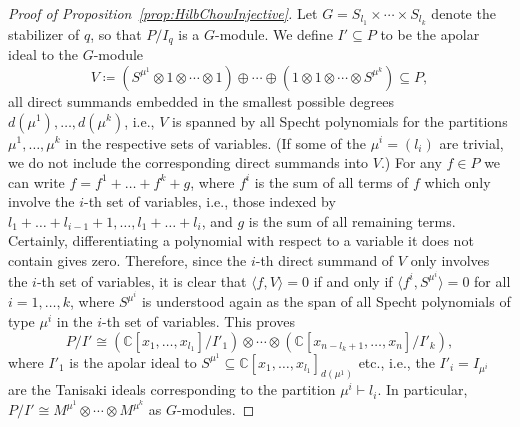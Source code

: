 \documentclass[11pt]{amsart}
\theoremstyle{definition}
\newcommand{\CC}{\mathbb{C}}
\begin{document}
\begin{proof}[Proof of Proposition~\ref{prop:HilbChowInjective}]
    Let $G = S_{l_1} \times \cdots \times S_{l_k}$ denote the stabilizer of $q$, so that $P/I_q$ is a $G$-module. We define $I' \subseteq P$ to be the apolar ideal to the $G$-module
    \begin{equation*}
        V \coloneqq \left( S^{\mu^1} \otimes 1 \otimes \cdots \otimes 1 \right) \oplus \cdots \oplus \left( 1 \otimes 1 \otimes \cdots \otimes S^{\mu^k} \right) \subseteq P,
    \end{equation*}
    all direct summands embedded in the smallest possible degrees $d(\mu^1), \ldots, d(\mu^k)$, i.e., $V$ is spanned by all Specht polynomials for the partitions $\mu^1, \ldots, \mu^k$ in the respective sets of variables.
    (If some of the $\mu^i = (l_i)$ are trivial, we do not include the corresponding direct summands into $V$.)
    For any $f \in P$ we can write $f = f^1 + \ldots + f^k + g$, where $f^i$ is the sum of all terms of $f$ which only involve the $i$-th set of variables, i.e., those indexed by $l_1 + \ldots + l_{i-1} + 1, \ldots, l_1 + \ldots + l_i$, and $g$ is the sum of all remaining terms. Certainly, differentiating a polynomial with respect to a variable it does not contain gives zero. Therefore, since the $i$-th direct summand of $V$ only involves the $i$-th set of variables, it is clear that $\langle f, V \rangle = 0$ if and only if $\langle f^i, S^{\mu^i} \rangle = 0$ for all $i = 1, \ldots, k$, where $S^{\mu^i}$ is understood again as the span of all Specht polynomials of type $\mu^i$ in the $i$-th set of variables.
    This proves
    \begin{equation*}
        P/I' \cong \left( \CC[x_1,\ldots,x_{l_1}]/I'_1 \right) \otimes \cdots \otimes \left( \CC[x_{n-l_k+1},\ldots, x_n]/I'_k \right),
    \end{equation*}
    where $I'_1$ is the apolar ideal to $S^{\mu^1} \subseteq \CC[x_1,\ldots,x_{l_1}]_{d(\mu^1)}$ etc., i.e., the $I'_i = I_{\mu^i}$ are the Tanisaki ideals corresponding to the partition $\mu^i \vdash l_i$. In particular, $P/I' \cong M^{\mu^1} \otimes \cdots \otimes M^{\mu^k}$ as $G$-modules.
    

\end{proof}
\end{document}
